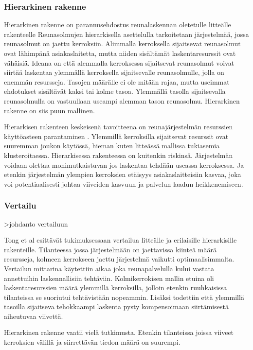 \subsubsection{Hierarkinen rakenne}
Hierarkinen rakenne on parannusehdostus reunalaskennan oletetulle litteälle rakenteelle \cite{tong2016hierarchial}
Reunasolmujen hierarkisella asettelulla tarkoitetaan järjestelmää, jossa reunasolmut on jaettu kerroksiin. Alimmalla kerroksella sijaitsevat reunasolmut ovat lähimpänä asiakaslaitetta, mutta niiden sisältämät laskentaresurssit ovat vähäisiä. 
Ideana on että alemmalla kerroksessa sijaitsevat reunasolmut voivat siirtää laskentaa ylemmällä kerroksella sijaitsevalle reunasolmulle, jolla on enemmän resursseja. Tasojen määrälle ei ole mitään rajaa, mutta useimmat ehdotukset sisältävät kaksi tai kolme tasoa.
Ylemmällä tasolla sijaitsevalla reunasolmulla on vastuullaan useampi alemman tason reunasolmu. Hierarkinen rakenne on siis puun mallinen.

Hierarkisen rakenteen keskeisenä tavoitteena on reunajärjestelmän resurssien käyttöasteen parantaminen \cite{tong2016hierarchial}. Ylemmillä kerroksilla sijaitsevat resurssit ovat suuremman joukon käytössä, hieman kuten litteässä mallissa tukiasemia klusteroitaessa. 
Hierarkisessa rakenteessa on kuitenkin riskinsä. Järjestelmän voidaan olettaa monimutkaistuvan jos laskentaa tehdään useassa kerroksessa. Ja etenkin järjestelmän ylempien kerroksien etäisyys asiakaslaitteisiin kasvaa, joka voi potentiaalisesti johtaa viiveiden kasvuun ja palvelun laadun heikkenemiseen.


\subsubsection{Vertailu}
>johdanto vertailuun

Tong et al \cite{tong2016hierarchical} esittävät tukimuksessaan vertailua litteälle ja erilaisille hierarkisille rakenteille. Tilanteessa jossa järjestelmään on jaettavissa kiinteä määrä resursseja, kolmeen kerrokseen jaettu järjestelmä vaikutti optimaalisimmalta.
Vertailun mittarina käytettiin aikaa joka reunapalvelulla kului vastata annettuihin laskennallisiin tehtäviin. Kolmikerrokisen mallin etuina oli laskentaresurssien määrä ylemmillä kerroksilla, jolloin etenkin ruuhkaisissa tilanteissa se suoriutui tehtävistään nopeammin. Lisäksi todettiin että ylemmillä tasoilla sijaitseva tehokkaampi laskenta pysty kompensoimaan siirtämisestä aiheutuvaa viivettä. 

Hierarkinen rakenne vaatii vielä tutkimusta. Etenkin tilanteissa joissa viiveet kerroksien välillä ja siirrettävän tiedon määrä on suurempi.




















